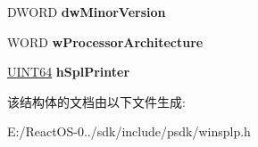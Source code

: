 \begin{DoxyCompactItemize}
D\+W\+O\+RD {\bfseries dw\+Minor\+Version}
\item 
\mbox{\label{struct___s_p_l_c_l_i_e_n_t___i_n_f_o__3_a8b92b5aa5dc2602afac4a65c3bfba912}} 
W\+O\+RD {\bfseries w\+Processor\+Architecture}
\item 
\mbox{\label{struct___s_p_l_c_l_i_e_n_t___i_n_f_o__3_a4bba2de82f5c0bd9a39ad76661f2ccf7}} 
\hyperlink{_processor_bind_8h_a57be03562867144161c1bfee95ca8f7c}{U\+I\+N\+T64} {\bfseries h\+Spl\+Printer}
\end{DoxyCompactItemize}


该结构体的文档由以下文件生成\+:\begin{DoxyCompactItemize}
\item 
E\+:/\+React\+O\+S-\/0../sdk/include/psdk/winsplp.\+h\end{DoxyCompactItemize}
